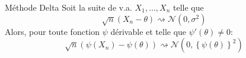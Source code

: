 \documentclass[10pt, french]{article}
\begin{document}
\begin{multicols*}{3}
\begin{itemize}
	\begin{formula}{Méthode Delta}
	Soit la suite de v.a. $X_{1}, \dots, X_{n}$ telle que
	\begin{equation*}
		\sqrt{n}(X_{n} - \theta) \rightsquigarrow \mathcal{N}(0, \sigma^{2})
	\end{equation*}
	Alors, pour toute fonction $\psi$ dérivable et telle que $\psi'(\theta) \neq 0$:
	\begin{equation*}
		\sqrt{n}(\psi(X_{n}) - \psi(\theta)) \rightsquigarrow \mathcal{N}(0, \left\{\psi(\theta)\right\}^{2})
	\end{equation*}
	\end{formula}


	
	
	
%	
%	
\end{itemize}


\end{multicols*}
\end{document}
